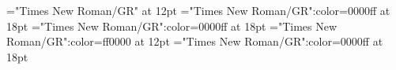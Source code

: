 \documentclass[a4paper]{article}
\begin{document}
\pagestyle{plain}
\sloppy
\setlength{\parfillskip}{0pt plus 1fil}
\font\main="Times New Roman/GR" at 12pt
\font\bamain="Times New Roman/GR":color=0000ff at 18pt
\font\amain="Times New Roman/GR":color=0000ff at 18pt
\font\bmain="Times New Roman/GR":color=ff0000 at 12pt
\font\aenmain="Times New Roman/GR":color=0000ff at 18pt

\mbox{} 
\newpage 
\newpage 
\setcounter{page}{1} 
\pagestyle{fancy} 






\end{document}
